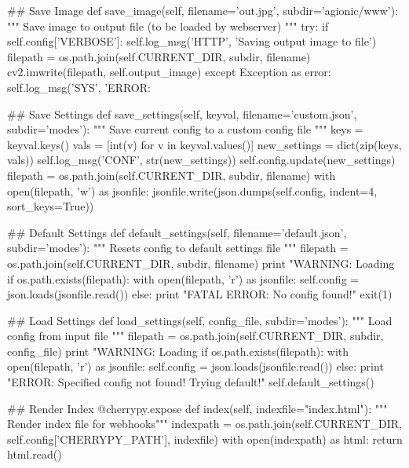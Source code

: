 \begin{python}
    ## Save Image
    def save_image(self, filename='out.jpg', subdir='agionic/www'):
        """ Save image to output file (to be loaded by webserver) """
        try:
            if self.config['VERBOSE']: self.log_msg('HTTP', 'Saving output image to file')
            filepath = os.path.join(self.CURRENT_DIR, subdir, filename)
            cv2.imwrite(filepath, self.output_image)
        except Exception as error:
            self.log_msg('SYS', 'ERROR: %

    ## Save Settings
    def save_settings(self, keyval, filename='custom.json', subdir='modes'):
        """ Save current config to a custom config file """
        keys = keyval.keys()
        vals = [int(v) for v in keyval.values()]
        new_settings = dict(zip(keys, vals))
        self.log_msg('CONF', str(new_settings))
        self.config.update(new_settings)
        filepath = os.path.join(self.CURRENT_DIR, subdir, filename)
        with open(filepath, 'w') as jsonfile:
            jsonfile.write(json.dumps(self.config, indent=4, sort_keys=True))
    
    ## Default Settings
    def default_settings(self, filename='default.json', subdir='modes'):
        """ Resets config to default settings file """
        filepath = os.path.join(self.CURRENT_DIR, subdir, filename)
        print "WARNING: Loading %
        if os.path.exists(filepath):
            with open(filepath, 'r') as jsonfile:
                self.config = json.loads(jsonfile.read())
        else:
            print "FATAL ERROR: No config found!"
            exit(1)

    ## Load Settings
    def load_settings(self, config_file, subdir='modes'):
        """ Load config from input file """
        filepath = os.path.join(self.CURRENT_DIR, subdir, config_file)
        print "WARNING: Loading %
        if os.path.exists(filepath):
            with open(filepath, 'r') as jsonfile:
                self.config = json.loads(jsonfile.read())
        else:
            print "ERROR: Specified config not found! Trying default!"            
            self.default_settings()

    ## Render Index
    @cherrypy.expose
    def index(self, indexfile="index.html"):
        """ Render index file for webhooks"""
        indexpath = os.path.join(self.CURRENT_DIR, self.config['CHERRYPY_PATH'], indexfile)
        with open(indexpath) as html:
            return html.read()


\end{python}
